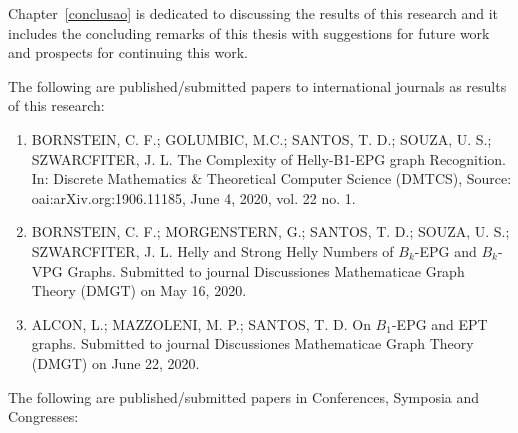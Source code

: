 Chapter~\ref{conclusao} is dedicated to discussing the results of this research and it includes the concluding remarks of this thesis with suggestions for future work and prospects for continuing this work.


The following are  published/submitted papers to international journals  as results of this research:
 
\begin{enumerate}
    
     \item BORNSTEIN, C. F.; GOLUMBIC, M.C.; SANTOS, T. D.; SOUZA, U. S.; SZWARCFITER, J. L.  The Complexity of Helly-B1-EPG graph Recognition. In: Discrete Mathematics \& Theoretical Computer Science (DMTCS), Source: oai:arXiv.org:1906.11185, June 4, 2020,  vol. 22 no. 1. 
     
     \item BORNSTEIN, C. F.; MORGENSTERN, G.; SANTOS, T. D.; SOUZA, U. S.; SZWARCFITER, J. L.  Helly and Strong Helly Numbers of $B_k$-EPG and $B_k$-VPG Graphs. Submitted to journal Discussiones Mathematicae Graph Theory (DMGT) on  May 16, 2020. 
     \item ALCON, L.; MAZZOLENI, M. P.;  SANTOS, T. D. On $B_1$-EPG  and EPT graphs. Submitted to journal Discussiones Mathematicae Graph Theory (DMGT) on June 22, 2020.
\end{enumerate}

The following are  published/submitted papers in Conferences, Symposia and Congresses: 


